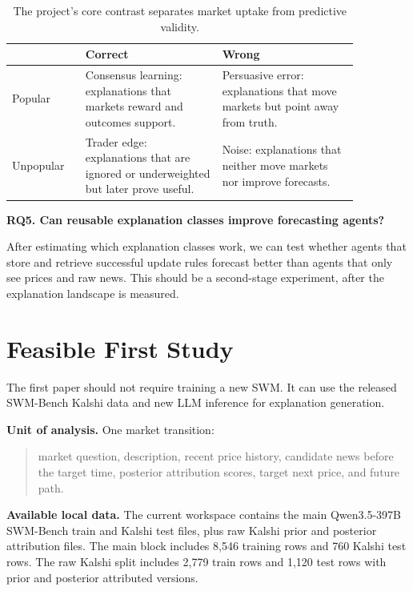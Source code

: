 \documentclass[11pt]{article}
\begin{document}
\begin{table}[H]
\centering
\small
\begin{tabular}{>{\raggedright\arraybackslash}p{0.18\linewidth}>{\raggedright\arraybackslash}p{0.34\linewidth}>{\raggedright\arraybackslash}p{0.34\linewidth}}
\toprule
 & Correct & Wrong \\
\midrule
Popular & Consensus learning: explanations that markets reward and outcomes support. & Persuasive error: explanations that move markets but point away from truth. \\
Unpopular & Trader edge: explanations that are ignored or underweighted but later prove useful. & Noise: explanations that neither move markets nor improve forecasts. \\
\bottomrule
\end{tabular}
\caption{The project's core contrast separates market uptake from predictive validity.}
\end{table}

\textbf{RQ5. Can reusable explanation classes improve forecasting agents?}

After estimating which explanation classes work, we can test whether agents that store and retrieve successful update rules forecast better than agents that only see prices and raw news. This should be a second-stage experiment, after the explanation landscape is measured.

\section{Feasible First Study}
The first paper should not require training a new SWM. It can use the released SWM-Bench Kalshi data and new LLM inference for explanation generation.

\textbf{Unit of analysis.} One market transition:

\begin{quote}
\small
market question, description, recent price history, candidate news before the target time, posterior attribution scores, target next price, and future path.
\end{quote}

\textbf{Available local data.} The current workspace contains the main Qwen3.5-397B SWM-Bench train and Kalshi test files, plus raw Kalshi prior and posterior attribution files. The main block includes 8,546 training rows and 760 Kalshi test rows. The raw Kalshi split includes 2,779 train rows and 1,120 test rows with prior and posterior attributed versions.
\end{document}
